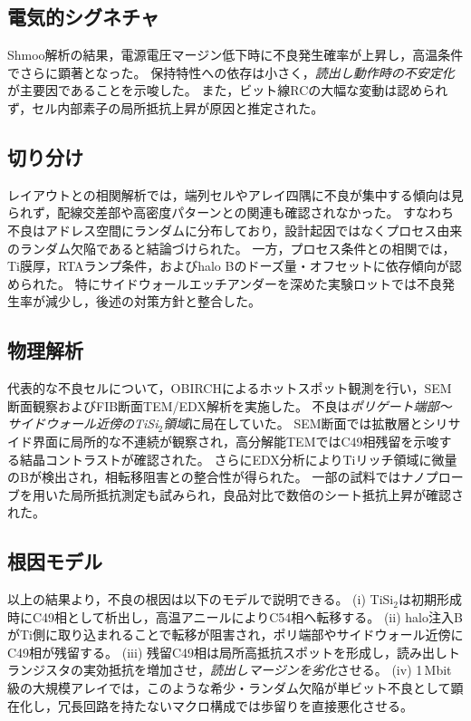 \documentclass[conference]{IEEEtran}
\begin{document}
\subsection{電気的シグネチャ}
Shmoo解析の結果，電源電圧マージン低下時に不良発生確率が上昇し，高温条件でさらに顕著となった。  
保持特性への依存は小さく，\emph{読出し動作時の不安定化}が主要因であることを示唆した。  
また，ビット線RCの大幅な変動は認められず，セル内部素子の局所抵抗上昇が原因と推定された。

\subsection{切り分け}
レイアウトとの相関解析では，端列セルやアレイ四隅に不良が集中する傾向は見られず，配線交差部や高密度パターンとの関連も確認されなかった。  
すなわち不良はアドレス空間にランダムに分布しており，設計起因ではなくプロセス由来のランダム欠陥であると結論づけられた。  
一方，プロセス条件との相関では，Ti膜厚，RTAランプ条件，およびhalo Bのドーズ量・オフセットに依存傾向が認められた。  
特にサイドウォールエッチアンダーを深めた実験ロットでは不良発生率が減少し，後述の対策方針と整合した。

\subsection{物理解析}
代表的な不良セルについて，OBIRCHによるホットスポット観測を行い，SEM断面観察およびFIB断面TEM/EDX解析を実施した。  
不良は\emph{ポリゲート端部〜サイドウォール近傍のTiSi$_2$領域}に局在していた。  
SEM断面では拡散層とシリサイド界面に局所的な不連続が観察され，高分解能TEMではC49相残留を示唆する結晶コントラストが確認された。  
さらにEDX分析によりTiリッチ領域に微量のBが検出され，相転移阻害との整合性が得られた。  
一部の試料ではナノプローブを用いた局所抵抗測定も試みられ，良品対比で数倍のシート抵抗上昇が確認された。

\subsection{根因モデル}
以上の結果より，不良の根因は以下のモデルで説明できる。  
(i) TiSi$_2$は初期形成時にC49相として析出し，高温アニールによりC54相へ転移する。  
(ii) halo注入BがTi側に取り込まれることで転移が阻害され，ポリ端部やサイドウォール近傍にC49相が残留する。  
(iii) 残留C49相は局所高抵抗スポットを形成し，読み出しトランジスタの実効抵抗を増加させ，\emph{読出しマージンを劣化}させる。  
(iv) 1\,Mbit級の大規模アレイでは，このような希少・ランダム欠陥が単ビット不良として顕在化し，冗長回路を持たないマクロ構成では歩留りを直接悪化させる。
\end{document}
